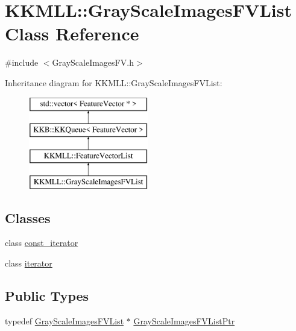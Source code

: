 \hypertarget{class_k_k_m_l_l_1_1_gray_scale_images_f_v_list}{}\section{K\+K\+M\+LL\+:\+:Gray\+Scale\+Images\+F\+V\+List Class Reference}
\label{class_k_k_m_l_l_1_1_gray_scale_images_f_v_list}


{\ttfamily \#include $<$Gray\+Scale\+Images\+F\+V.\+h$>$}

Inheritance diagram for K\+K\+M\+LL\+:\+:Gray\+Scale\+Images\+F\+V\+List\+:\begin{figure}[H]
\begin{center}
\leavevmode
\includegraphics[height=4.000000cm]{class_k_k_m_l_l_1_1_gray_scale_images_f_v_list}
\end{center}
\end{figure}
\subsection*{Classes}
\begin{DoxyCompactItemize}
\item 
class \hyperlink{class_k_k_m_l_l_1_1_gray_scale_images_f_v_list_1_1const__iterator}{const\+\_\+iterator}
\item 
class \hyperlink{class_k_k_m_l_l_1_1_gray_scale_images_f_v_list_1_1iterator}{iterator}
\end{DoxyCompactItemize}
\subsection*{Public Types}
\begin{DoxyCompactItemize}
\item 
typedef \hyperlink{class_k_k_m_l_l_1_1_gray_scale_images_f_v_list}{Gray\+Scale\+Images\+F\+V\+List} $\ast$ \hyperlink{class_k_k_m_l_l_1_1_gray_scale_images_f_v_list_adf1c0ec2049ac8cb8689dc30f8f78ac3}{Gray\+Scale\+Images\+F\+V\+List\+Ptr}
\end{DoxyCompactItemize}
